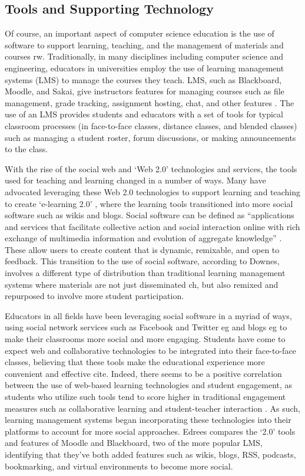 \begin{itemize}
\section{Tools and Supporting Technology}

Of course, an important aspect of computer science education is the use of software to support learning, teaching, and the management of materials and courses {rw}. Traditionally, in many disciplines including computer science and engineering, educators in universities employ the use of learning management systems (LMS) to manage the courses they teach. LMS, such as Blackboard, Moodle, and Sakai, give instructors features for managing courses such as file management, grade tracking, assignment hosting, chat, and other features \cite{kumar2011comparative}. The use of an LMS provides students and educators with a set of tools for typical classroom processes (in face-to-face classes, distance classes, and blended classes) such as managing a student roster, forum discussions, or making announcements to the class.

With the rise of the social web and ‘Web 2.0’ technologies and services, the tools used for teaching and learning changed in a number of ways. Many have advocated leveraging these Web 2.0 technologies to support learning and teaching to create ‘e-learning 2.0’ \cite{downes2005feature}, where the learning tools transitioned into more social software such as wikis and blogs. Social software can be defined as ``applications and services that facilitate collective action and social interaction online with rich exchange of multimedia information and evolution of aggregate knowledge'' \cite{parameswaran2007social}. These allow users to create content that is dynamic, remixable, and open to feedback. This transition to the use of social software, according to Downes, involves a different type of distribution than traditional learning management systems where materials are not just disseminated {ch}, but also remixed and repurposed to involve more student participation.

Educators in all fields have been leveraging social software in a myriad of ways, using social network services such as Facebook \cite{goh2013students} and Twitter {eg} and blogs {eg} to make their classrooms more social and more engaging. Students have come to expect web and collaborative technologies to be integrated into their face-to-face classes, believing that these tools make the educational experience more convenient and effective {cite}. Indeed, there seems to be a positive correlation between the use of web-based learning technologies and student engagement, as students who utilize such tools tend to score higher in traditional engagement measures such as collaborative learning and student-teacher interaction \cite{chen2010engaging}. As such, learning management systems began incorporating these technologies into their platforms to account for more social approaches. Edrees \cite{edrees2013elearning} compares the `2.0' tools and features of Moodle and Blackboard, two of the more popular LMS, identifying that they’ve both added features such as wikis, blogs, RSS, podcasts, bookmarking, and virtual environments to become more social.


\end{itemize}
